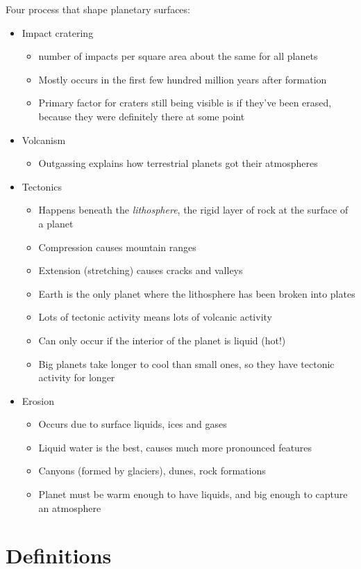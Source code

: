 \documentclass[12pt]{article}
\begin{document}
Four process that shape planetary surfaces:
\begin{itemize}
\item Impact cratering
\begin{itemize}
\item number of impacts per square area about the same for all planets
\item Mostly occurs in the first few hundred million years after formation
\item Primary factor for craters still being visible is if they've been erased, because they were definitely there at some point
\end{itemize}
\item Volcanism
\begin{itemize}
\item Outgassing explains how terrestrial planets got their atmospheres
\end{itemize}
\item Tectonics
\begin{itemize}
\item Happens beneath the \emph{lithosphere}, the rigid layer of rock at the surface of a planet
\item Compression causes mountain ranges
\item Extension (stretching) causes cracks and valleys
\item Earth is the only planet where the lithosphere has been broken into plates
\item Lots of tectonic activity means lots of volcanic activity
\item Can only occur if the interior of the planet is liquid (hot!)
\item Big planets take longer to cool than small ones, so they have tectonic activity for longer
\end{itemize}
\item Erosion
\begin{itemize}
\item Occurs due to surface liquids, ices and gases
\item Liquid water is the best, causes much more pronounced features
\item Canyons (formed by glaciers), dunes, rock formations
\item Planet must be warm enough to have liquids, and big enough to capture an atmosphere
\end{itemize}
\end{itemize}


\section{Definitions}
\end{document}
